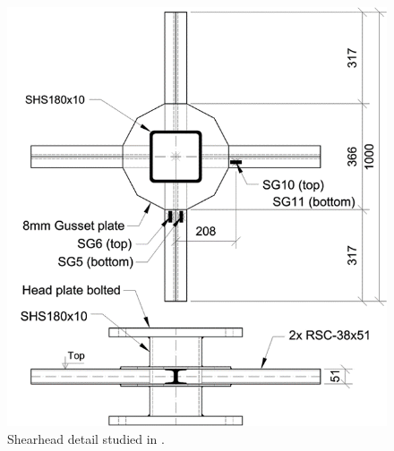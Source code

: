 \begin{figure}\centering
    \includegraphics[width=\columnwidth]{Figures/e2010f9b.png}
    \caption{Shearhead detail studied in \cite{eder2010,EDER20111164}.}
    \label{e2010f9b}
    \end{figure}
